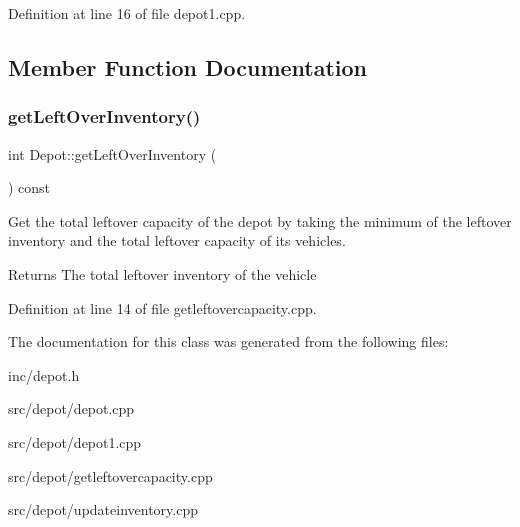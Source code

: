 Definition at line 16 of file depot1.\+cpp.



\subsection{Member Function Documentation}
\mbox{\label{class_depot_a443f83f05f5b5f939f5f7d67a615239a}} 
\subsubsection{\texorpdfstring{get\+Left\+Over\+Inventory()}{getLeftOverInventory()}}
{\footnotesize\ttfamily int Depot\+::get\+Left\+Over\+Inventory (\begin{DoxyParamCaption}{ }\end{DoxyParamCaption}) const}



Get the total leftover capacity of the depot by taking the minimum of the leftover inventory and the total leftover capacity of its vehicles. 

\begin{DoxyReturn}{Returns}
The total leftover inventory of the vehicle 
\end{DoxyReturn}


Definition at line 14 of file getleftovercapacity.\+cpp.



The documentation for this class was generated from the following files\+:\begin{DoxyCompactItemize}
\item 
inc/depot.\+h\item 
src/depot/depot.\+cpp\item 
src/depot/depot1.\+cpp\item 
src/depot/getleftovercapacity.\+cpp\item 
src/depot/updateinventory.\+cpp\end{DoxyCompactItemize}
